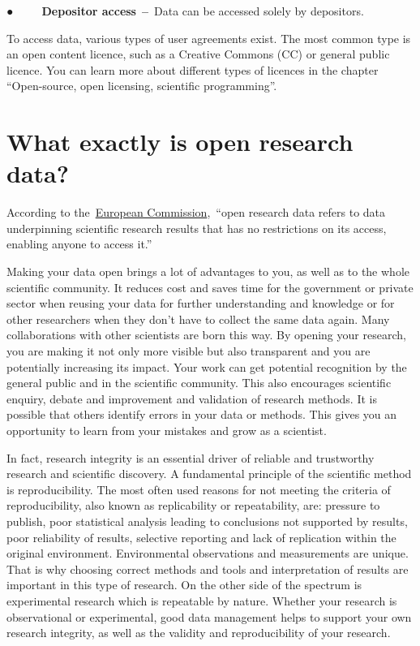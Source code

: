 \documentclass[
]{book}
\begin{document}
● ~ ~ ~\textbf{Depositor access}~\textbf{--}~Data can be accessed solely by depositors.

To access data, various types of user agreements exist. The most common type is an open content licence, such as a Creative Commons (CC) or general public licence. You can learn more about different types of licences in the chapter ``Open-source, open licensing, scientific programming''.

\hypertarget{what-exactly-is-open-research-data}{%
\section{\texorpdfstring{\textbf{What exactly is open research data?}}{What exactly is open research data?}}\label{what-exactly-is-open-research-data}}

According to the~\href{https://ec.europa.eu/info/research-and-innovation/strategy/strategy-2020-2024/our-digital-future/open-science/open-science-monitor/facts-and-figures-open-research-data_en}{}\href{https://ec.europa.eu/info/research-and-innovation/strategy/strategy-2020-2024/our-digital-future/open-science/open-science-monitor/facts-and-figures-open-research-data_en}{European Commission},~``open research data refers to data underpinning scientific research results that has no restrictions on its access, enabling anyone to access it.''

Making your data open brings a lot of advantages to you, as well as to the whole scientific community. It reduces cost and saves time for the government or private sector when reusing your data for further understanding and knowledge or for other researchers when they don't have to collect the same data again. Many collaborations with other scientists are born this way. By opening your research, you are making it not only more visible but also transparent and you are potentially increasing its impact. Your work can get potential recognition by the general public and in the scientific community. This also encourages scientific enquiry, debate and improvement and validation of research methods. It is possible that others identify errors in your data or methods. This gives you an opportunity to learn from your mistakes and grow as a scientist.

In fact, research integrity is an essential driver of reliable and trustworthy research and scientific discovery. A fundamental principle of the scientific method is reproducibility. The most often used reasons for not meeting the criteria of reproducibility, also known as replicability or repeatability, are: pressure to publish, poor statistical analysis leading to conclusions not supported by results, poor reliability of results, selective reporting and lack of replication within the original environment. Environmental observations and measurements are unique. That is why choosing correct methods and tools and interpretation of results are important in this type of research. On the other side of the spectrum is experimental research which is repeatable by nature. Whether your research is observational or experimental, good data management helps to support your own research integrity, as well as the validity and reproducibility of your research.
\end{document}
